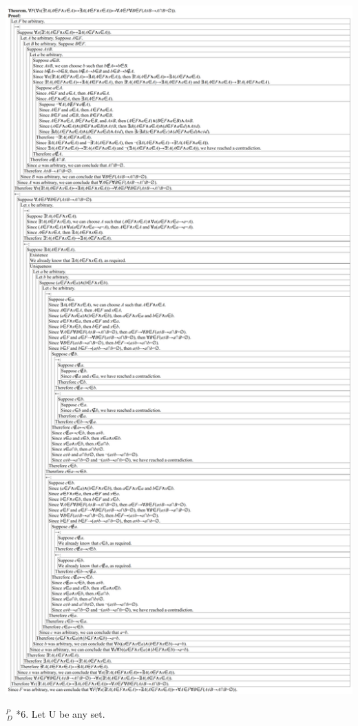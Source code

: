 \documentclass{article}
\begin{document}
\includegraphics[width=\textwidth,height=\textheight,keepaspectratio]{3_6_5_2}

\vspace{30pt}

$^{\textit{P}}_{\, \textit{D}}$ *6. Let U be any set.
\end{document}
